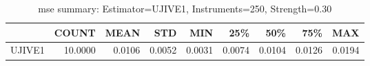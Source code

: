 \begin{table}[ht]
\centering
\caption{mse summary: Estimator=UJIVE1, Instruments=250, Strength=0.30}
\begin{tabular}{lrrrrrrrr}
\toprule
 & COUNT & MEAN & STD & MIN & 25\% & 50\% & 75\% & MAX \\
\midrule
UJIVE1 & 10.0000 & 0.0106 & 0.0052 & 0.0031 & 0.0074 & 0.0104 & 0.0126 & 0.0194 \\
\bottomrule
\end{tabular}
\end{table}
